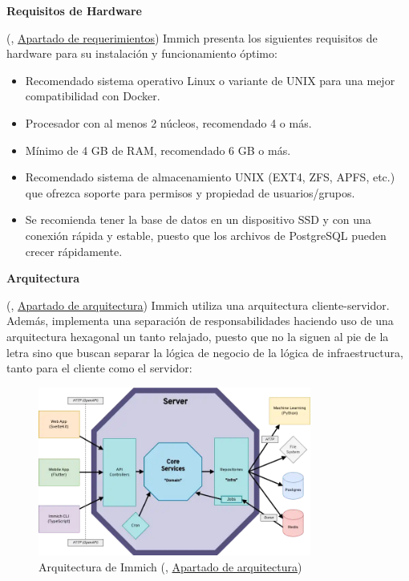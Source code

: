 \textbf{Requisitos de Hardware}

(\cite{immich-documentation}, \href{https://immich.app/docs/install/requirements}{Apartado de requerimientos}) Immich presenta los siguientes requisitos de hardware para su instalación y funcionamiento óptimo:

\begin{itemize}
    \item Recomendado sistema operativo Linux o variante de UNIX para una mejor compatibilidad con Docker.
    \item Procesador con al menos 2 núcleos, recomendado 4 o más.
    \item Mínimo de 4 GB de RAM, recomendado 6 GB o más.
    \item Recomendado sistema de almacenamiento UNIX (EXT4, ZFS, APFS, etc.) que ofrezca soporte para permisos y propiedad de usuarios/grupos.
    \item Se recomienda tener la base de datos en un dispositivo SSD y con una conexión rápida y estable, puesto que los archivos de PostgreSQL pueden crecer rápidamente.
\end{itemize}

\textbf{Arquitectura}

(\cite{immich-documentation}, \href{https://immich.app/docs/developer/architecture/}{Apartado de arquitectura}) Immich utiliza una arquitectura cliente-servidor. Además, implementa una separación de responsabilidades haciendo uso de una arquitectura hexagonal un tanto relajado, puesto que no la siguen al pie de la letra sino que buscan separar la lógica de negocio de la lógica de infraestructura, tanto para el cliente como el servidor:

\begin{figure}[H]
  \centering
  \includegraphics[width=0.8\textwidth]{assets/immich-architecture.png}
  \caption{Arquitectura de Immich (\cite{immich-documentation}, \href{https://immich.app/docs/developer/architecture/}{Apartado de arquitectura})}
  \label{fig:immich-architecture}
\end{figure}


